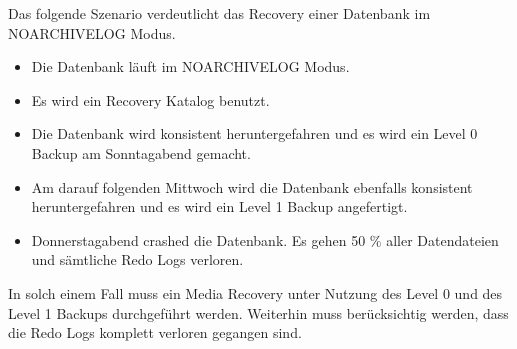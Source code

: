         Das folgende Szenario verdeutlicht das Recovery einer Datenbank im NOARCHIVELOG Modus.
        \begin{itemize}
          \item Die Datenbank läuft im NOARCHIVELOG Modus.
          \item Es wird ein Recovery Katalog benutzt.
          \item Die Datenbank wird konsistent heruntergefahren und es wird ein Level 0 Backup am Sonntagabend gemacht.
          \item Am darauf folgenden Mittwoch wird die Datenbank ebenfalls konsistent heruntergefahren und es wird ein Level 1 Backup angefertigt.
          \item Donnerstagabend crashed die Datenbank. Es gehen 50 \% aller Datendateien und sämtliche Redo Logs verloren.
        \end{itemize}
        In solch einem Fall muss ein Media Recovery unter Nutzung des Level 0 und des Level 1 Backups durchgeführt werden. Weiterhin muss berücksichtig werden, dass die Redo Logs komplett verloren gegangen sind.
